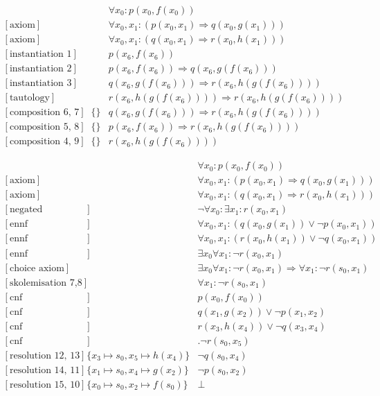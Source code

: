 \documentclass[onehalfspacing]{article}
\theoremstyle{definition}
\theoremstyle{definition}
\theoremstyle{definition}
\theoremstyle{definition}
\theoremstyle{definition}
\theoremstyle{definition}
\begin{document}
\setcounter{equation}{0}
\begin{align}
	[\text{axiom}] && \forall x_0: p(x_0,f(x_0))\\
	[\text{axiom}] && \forall x_0, x_1 : (p(x_0,x_1) \Rightarrow q(x_0,g(x_1)))\\
	[\text{axiom}] && \forall x_0, x_1 : (q(x_0,x_1) \Rightarrow r(x_0,h(x_1)))\\
	[\text{instantiation 1}] && p(x_6, f(x_6))\\
	[\text{instantiation 2}] && p(x_6, f(x_6))\Rightarrow q(x_6,g(f(x_6))) \\
	[\text{instantiation 3}] && q(x_6, g(f(x_6)))\Rightarrow r(x_6,h(g(f(x_6)))) \\
	[\text{tautology}] && r(x_6, h(g(f(x_6))))\Rightarrow r(x_6,h(g(f(x_6))))\\
	[\text{composition 6, 7}] &\{\}&q(x_6, g(f(x_6)))\Rightarrow r(x_6,h(g(f(x_6))))\\
	[\text{composition 5, 8}] &\{\}&p(x_6,f(x_6))\Rightarrow r(x_6, h(g(f(x_6))))\\
	[\text{composition 4, 9}] &\{\}&r(x_6, h(g(f(x_6))))
\end{align}

\pagebreak

\setcounter{equation}{0}
\begin{align}
	[\text{axiom}] && \forall x_0: p(x_0,f(x_0))\\
	[\text{axiom}] && \forall x_0, x_1 : (p(x_0,x_1) \Rightarrow q(x_0,g(x_1)))\\
	[\text{axiom}] && \forall x_0, x_1 : (q(x_0,x_1) \Rightarrow r(x_0,h(x_1)))\\
	[\text{negated conjecture}] &&\neg\forall  x_0 : \exists x_1 : r(x_0,x_1)\\
	[\text{ennf transformation 2}] && \forall x_0, x_1 : (q(x_0,g(x_1)) \vee \neg p(x_0,x_1)) \\
	[\text{ennf transformation 3}] &&\forall x_0, x_1 : (r(x_0,h(x_1)) \vee \neg q(x_0, x_1)) \\
	[\text{ennf transformation 4}] && \exists x_0 \forall x_1 : \neg r(x_0, x_1)\\
	[\text{choice axiom}] && \exists x_0 \forall x_1 : \neg r(x_0, x_1) \Rightarrow \forall x_1 : \neg r(s_0,x_1)\\
	[\text{skolemisation 7,8}] && \forall x_1 : \neg r(s_0, x_1)\\
	[\text{cnf transformation 1}] && p(x_0,f(x_0))\\
	[\text{cnf transformation 5}] && q(x_1,g(x_2)) \vee \neg p(x_1, x_2)\\
	[\text{cnf transformation 6}] && r(x_3,h(x_4)) \vee \neg q(x_3, x_4)\\
	[\text{cnf transformation 9}] &&. \neg r(s_0,x_5)\\
	[\text{resolution 12, 13}] &\{x_3\mapsto s_0, x_5\mapsto h(x_4)\}& \neg q(s_0,x_4)\\
	[\text{resolution 14, 11}] &\{x_1\mapsto s_0, x_4\mapsto g(x_2)\}&\neg p(s_0,x_2)\\
	[\text{resolution 15, 10}] &\{x_0\mapsto s_0, x_2\mapsto f(s_0)\}& \bot
\end{align}
\end{document}
